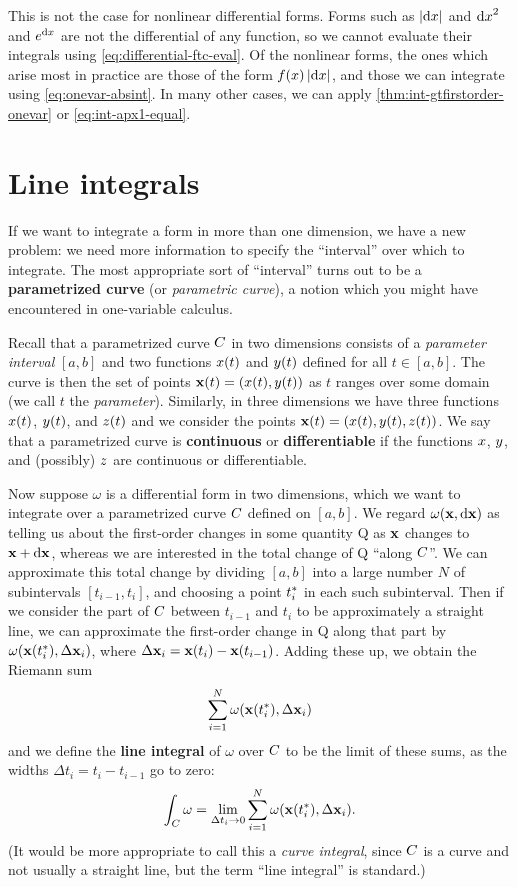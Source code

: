 \documentclass[12pt]{amsart}
\begin{document}
This is not the case for nonlinear differential forms.
Forms such as $|{\mathrm{d} x}|$ and ${\mathrm{d} x}^2$ and $e^{\mathrm{d} x}$ are not the differential of any function, so we cannot evaluate their integrals using \cref{eq:differential-ftc-eval}.
Of the nonlinear forms, the ones which arise most in practice are those of the form $f(x)\,|{\mathrm{d} x}|$, and those we can integrate using \cref{eq:onevar-absint}.
In many other cases, we can apply \cref{thm:int-gtfirstorder-onevar} or \cref{eq:int-apx1-equal}.


\section{Line integrals}
\label{sec:line-integrals}

If we want to integrate a form in more than one dimension, we have a new problem: we need more information to specify the ``interval'' over which to integrate.
The most appropriate sort of ``interval'' turns out to be a \textbf{parametrized curve} (or \emph{parametric curve}), a notion which you might have encountered in one-variable calculus.

Recall that a parametrized curve $C$ in two dimensions consists of a \emph{parameter interval} $[a,b]$ and two functions $x(t)$ and $y(t)$ defined for all $t\in [a,b]$.
The curve is then the set of points $\mathbf{x}(t) = (x(t),y(t))$ as $t$ ranges over some domain (we call $t$ the \emph{parameter}).
Similarly, in three dimensions we have three functions $x(t)$, $y(t)$, and $z(t)$ and we consider the points $\mathbf{x}(t) = (x(t),y(t),z(t))$.
We say that a parametrized curve is \textbf{continuous} or \textbf{differentiable} if the functions $x$, $y$, and (possibly) $z$ are continuous or differentiable.

Now suppose $\omega$ is a differential form in two dimensions, which we want to integrate over a parametrized curve $C$ defined on $[a,b]$.
We regard $\omega(\mathbf{x},{\mathrm{d} \mathbf{x}})$ as telling us about the first-order changes in some quantity Q as $\mathbf{x}$ changes to $\mathbf{x}+{\mathrm{d} \mathbf{x}}$, whereas we are interested in the total change of Q ``along $C$''.
We can approximate this total change by dividing $[a,b]$ into a large number $N$ of subintervals $[t_{i-1},t_i]$, and choosing a point ${t}_{i}^*$ in each such subinterval.
Then if we consider the part of $C$ between $t_{i-1}$ and $t_i$ to be approximately a straight line, we can approximate the first-order change in Q along that part by $\omega(\mathbf{x}({t}_{i}^*),\Delta \mathbf{x}_i)$, where $\Delta\mathbf{x}_i = \mathbf{x}(t_i)-\mathbf{x}(t_{i-1})$.
Adding these up, we obtain the Riemann sum
\[ \sum_{i=1}^N \omega(\mathbf{x}({t}_{i}^*),\Delta \mathbf{x}_i) \]
and we define the \textbf{line integral} of $\omega$ over $C$ to be the limit of these sums, as the widths $\Delta t_i = t_i - t_{i-1}$ go to zero:
\[ \int_{C} \omega = \lim_{\Delta t_i \to 0} \sum_{i=1}^N \omega(\mathbf{x}({t}_{i}^*),\Delta \mathbf{x}_i). \]
(It would be more appropriate to call this a \textit{curve integral}, since $C$ is a curve and not usually a straight line, but the term ``line integral'' is standard.)
\end{document}
